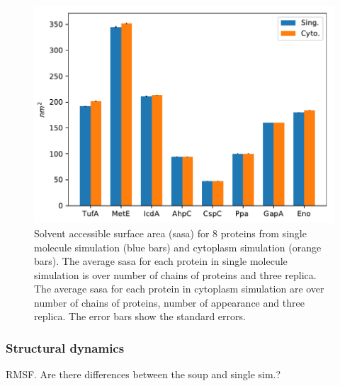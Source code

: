 \documentclass[journal=jacsat,manuscript=article]{achemso}
\begin{document}
\begin{figure}
\includegraphics[scale=0.6]{sasa.pdf}
\caption{Solvent accessible surface area (sasa) for 8 proteins from single molecule simulation (blue bars) and cytoplasm simulation (orange bars). The average sasa for each protein in single molecule simulation is over number of chains of proteins and three replica. The average sasa for each protein in cytoplasm simulation are over number of chains of proteins, number of appearance and three replica. The error bars show the standard errors.}

\end{figure}

\subsubsection{Structural dynamics}
RMSF. Are there differences between the soup and single sim.?
\end{document}
